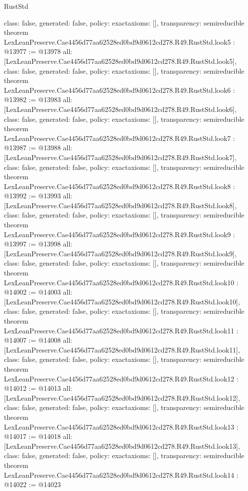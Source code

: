 \begin{lexlean}{RustStd}
\begin{coremodule}
{  class: false,
  generated: false,
  policy: exact{axioms: []},
  transparency: semireducible
}
theorem LexLeanPreserve.Cae4456d77aa62528ed0bd9d0612cd278.R49.RustStd.look5 : @13977 := @13978 {
  all: [LexLeanPreserve.Cae4456d77aa62528ed0bd9d0612cd278.R49.RustStd.look5],
  class: false,
  generated: false,
  policy: exact{axioms: []},
  transparency: semireducible
}
theorem LexLeanPreserve.Cae4456d77aa62528ed0bd9d0612cd278.R49.RustStd.look6 : @13982 := @13983 {
  all: [LexLeanPreserve.Cae4456d77aa62528ed0bd9d0612cd278.R49.RustStd.look6],
  class: false,
  generated: false,
  policy: exact{axioms: []},
  transparency: semireducible
}
theorem LexLeanPreserve.Cae4456d77aa62528ed0bd9d0612cd278.R49.RustStd.look7 : @13987 := @13988 {
  all: [LexLeanPreserve.Cae4456d77aa62528ed0bd9d0612cd278.R49.RustStd.look7],
  class: false,
  generated: false,
  policy: exact{axioms: []},
  transparency: semireducible
}
theorem LexLeanPreserve.Cae4456d77aa62528ed0bd9d0612cd278.R49.RustStd.look8 : @13992 := @13993 {
  all: [LexLeanPreserve.Cae4456d77aa62528ed0bd9d0612cd278.R49.RustStd.look8],
  class: false,
  generated: false,
  policy: exact{axioms: []},
  transparency: semireducible
}
theorem LexLeanPreserve.Cae4456d77aa62528ed0bd9d0612cd278.R49.RustStd.look9 : @13997 := @13998 {
  all: [LexLeanPreserve.Cae4456d77aa62528ed0bd9d0612cd278.R49.RustStd.look9],
  class: false,
  generated: false,
  policy: exact{axioms: []},
  transparency: semireducible
}
theorem LexLeanPreserve.Cae4456d77aa62528ed0bd9d0612cd278.R49.RustStd.look10 : @14002 := @14003 {
  all: [LexLeanPreserve.Cae4456d77aa62528ed0bd9d0612cd278.R49.RustStd.look10],
  class: false,
  generated: false,
  policy: exact{axioms: []},
  transparency: semireducible
}
theorem LexLeanPreserve.Cae4456d77aa62528ed0bd9d0612cd278.R49.RustStd.look11 : @14007 := @14008 {
  all: [LexLeanPreserve.Cae4456d77aa62528ed0bd9d0612cd278.R49.RustStd.look11],
  class: false,
  generated: false,
  policy: exact{axioms: []},
  transparency: semireducible
}
theorem LexLeanPreserve.Cae4456d77aa62528ed0bd9d0612cd278.R49.RustStd.look12 : @14012 := @14013 {
  all: [LexLeanPreserve.Cae4456d77aa62528ed0bd9d0612cd278.R49.RustStd.look12],
  class: false,
  generated: false,
  policy: exact{axioms: []},
  transparency: semireducible
}
theorem LexLeanPreserve.Cae4456d77aa62528ed0bd9d0612cd278.R49.RustStd.look13 : @14017 := @14018 {
  all: [LexLeanPreserve.Cae4456d77aa62528ed0bd9d0612cd278.R49.RustStd.look13],
  class: false,
  generated: false,
  policy: exact{axioms: []},
  transparency: semireducible
}
theorem LexLeanPreserve.Cae4456d77aa62528ed0bd9d0612cd278.R49.RustStd.look14 : @14022 := @14023 {
}
\end{coremodule}
\end{lexlean}
